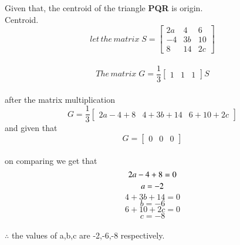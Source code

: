 \documentclass[journal]{IEEEtran}
\begin{document}
																Given that, the centroid of the triangle \textbf{PQR} is origin. \\
																Centroid.
																$$let\,the\,matrix\;S =
																\begin{bmatrix}
																2a&4&6\\
																-4&3b&10\\
																8&14&2c
																\end{bmatrix}$$\\
																$$The\,matrix\;G = \frac{1}{3}
																\begin{bmatrix}
																    1&1&1
																    \end{bmatrix}S$$\\
																    after the matrix multiplication
																    $$G =\frac{1}{3}
																    \begin{bmatrix}
																    2a-4+8&4+3b+14&6+10+2c
																    \end{bmatrix}$$
																    and given that
																    $$G =\begin{bmatrix}
																          0&0&0
																	        \end{bmatrix}$$\\
																		on comparing we get that
																		$$2a -4 + 8 = 0\\$$
																		\begin{equation}
																		    a = -2 \label{eq : 1-1.2-18-4}\\
																		    \end{equation}
																		    $$4 + 3b + 14 = 0$$
																		    \begin{equation}
																		        b = -6 \label{eq : 1-1.2-18-5}
																			\end{equation}
																			$$6 + 10 + 2c = 0$$
																			\begin{equation}
																			    c = -8\label{eq : 1-1.2-18-6}
																			    \end{equation}\\
																			    $\therefore $ the values of a,b,c are -2,-6,-8 respectively.
																			    
\end{document}
